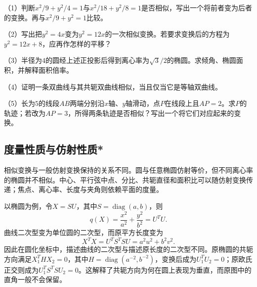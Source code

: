 \begin{exercise}
\mbox{}\par\nobreak

\begin{samepage}
（1）判断\(x^2/9+y^2/4=1\)与\(x^2/18+y^2/8=1\)是否相似，写出一个将前者变为后者的变换。再与\(x^2/9+y^2=1\)比较。
\par
\end{samepage}

\begin{samepage}
（2）写出把\(y^2=4x\)变为\(y^2=12x\)的一次相似变换。若要求变换后的方程为\(y^2=12x+8\)，应再作怎样的平移？
\par
\end{samepage}

\begin{samepage}
（3）半径为\(4\)的圆经上述正投影后得到离心率为\(\sqrt3/2\)的椭圆。求倾角、椭圆面积，并解释面积倍率。
\par
\end{samepage}

\begin{samepage}
（4）证明一条双曲线与其共轭双曲线相似，当且仅当它是等轴双曲线。
\par
\end{samepage}

\begin{samepage}
（5）长为\(5\)的线段\(AB\)两端分别沿\(x\)轴、\(y\)轴滑动，点\(P\)在线段上且\(AP=2\)。求\(P\)的轨迹；若改为\(AP=3\)，所得两条轨迹是否相似？写出一个将它们对应起来的变换。
\par
\end{samepage}
\end{exercise}

\newpage
\subsection{度量性质与仿射性质*}
\label{subsec:quadratic-metric-and-affine-properties}

相似变换与一般仿射变换保持的关系不同。圆与任意椭圆仿射等价，但不同离心率的椭圆并不相似。中心、平行弦中点、分比、共轭直径和面积比可以随仿射变换传递；焦点、离心率、长度与夹角则依赖平面的度量。

以椭圆为例，令\(X=SU\)，其中\(S=\operatorname{diag}(a,b)\)，则
\begin{equation*}
    q(X)=\frac{x^2}{a^2}+\frac{y^2}{b^2}=U^TU .
\end{equation*}
曲线二次型变为单位圆的二次型，而原平方长度变为
\begin{equation*}
    X^TX=U^TS^TSU=a^2u^2+b^2v^2 .
\end{equation*}
因此在圆化坐标中，描述曲线的二次型与描述原长度的二次型不同。原椭圆的共轭方向满足\(X_1^THX_2=0\)，其中\(H=\operatorname{diag}(a^{-2},b^{-2})\)，变换后成为\(U_1^TU_2=0\)；原欧氏正交则成为\(U_1^TS^TSU_2=0\)。这解释了共轭方向为何在圆上表现为垂直，而原图中的直角一般不会保留。


